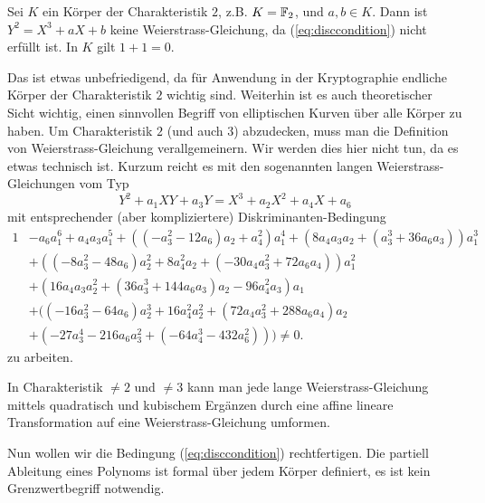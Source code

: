 \begin{bemerkung}
  Sei $K$ ein Körper der Charakteristik $2$, z.B. $K={\mathbb{F}}_2$, und
  $a,b\in K$. Dann ist $Y^2 = X^3+aX+b$ keine Weierstrass-Gleichung,
  da (\ref{eq:disccondition}) nicht erfüllt ist. In $K$ gilt $1+1=0$.

  Das ist etwas unbefriedigend, da für Anwendung in der Kryptographie
  endliche Körper der Charakteristik $2$ wichtig sind. Weiterhin ist es
  auch theoretischer Sicht wichtig, einen sinnvollen Begriff von
  elliptischen Kurven über alle Körper
  zu haben. Um Charakteristik $2$ (und auch $3$) abzudecken, muss man
  die Definition von Weierstrass-Gleichung verallgemeinern. Wir werden
  dies hier nicht tun, da es etwas technisch ist. Kurzum reicht es mit
  den sogenannten langen Weierstrass-Gleichungen vom Typ
  \begin{equation*}
    Y^2 + a_1 XY + a_3 Y = X^3+a_2 X^2 + a_4 X + a_6
  \end{equation*}
  mit entsprechender (aber kompliziertere) Diskriminanten-Bedingung
  \begin{alignat*}1
    &-a_6 a_1^6 + a_4 a_3 a_1^5 + ((-a_3^2 - 12 a_6) a_2 + a_4^2) a_1^4 +
    (8 a_4 a_3 a_2 + (a_3^3 + 36 a_6 a_3)) a_1^3\\
    &+ ((-8 a_3^2 - 48 a_6) a_2^2 +
    8 a_4^2 a_2 +
    (-30 a_4 a_3^2 + 72 a_6 a_4)) a_1^2 \\
    &+ (16 a_4 a_3 a_2^2 +
    (36 a_3^3 + 144 a_6 a_3) a_2 - 96 a_4^2 a_3) a_1 \\
    &+ ((-16 a_3^2 -
    64 a_6) a_2^3 + 16 a_4^2 a_2^2 + (72 a_4 a_3^2 + 288 a_6 a_4) a_2
    \\
    & +
    (-27 a_3^4 - 216 a_6 a_3^2 + (-64 a_4^3 - 432 a_6^2))) \not=0.
  \end{alignat*}
  zu arbeiten.

  In Charakteristik $\not=2$ und $\not=3$ kann man jede lange
  Weierstrass-Gleichung mittels quadratisch und kubischem Ergänzen
  durch eine affine lineare Transformation auf eine
  Weierstrass-Gleichung umformen. 
\end{bemerkung}

Nun wollen wir die Bedingung (\ref{eq:disccondition}) rechtfertigen.
Die partiell Ableitung eines Polynoms ist formal über jedem Körper
definiert, es ist kein Grenzwertbegriff notwendig.

